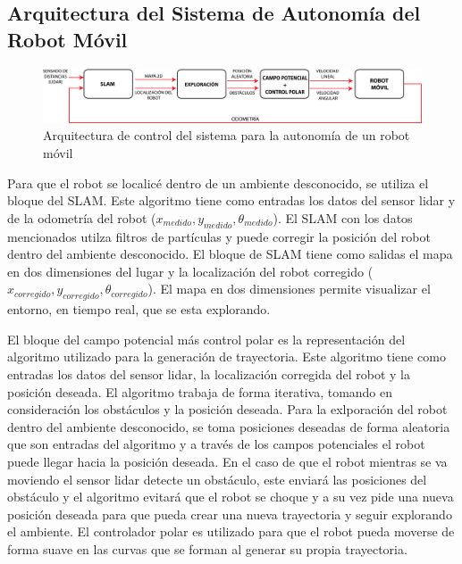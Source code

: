 
\subsection{Arquitectura del Sistema de Autonomía del Robot Móvil}

\begin{figure}%
	\centering \footnotesize
	\includegraphics[width=1.07\textwidth]{images/estructura_autonomia.jpg}
	\captionsetup{font=footnotesize}
	\caption{Arquitectura de control del sistema para la autonomía de un robot móvil}
	\label{fig:ArqSist}
\end{figure}
 
Para que el robot se localicé dentro de un ambiente desconocido, se utiliza el bloque del SLAM. 
Este algoritmo tiene como entradas los datos del sensor lidar y de la odometría del robot 
($x_{medido},y_{medido},\theta_{medido}$). El SLAM con los datos mencionados utilza filtros de 
partículas y puede corregir la posición del robot dentro del ambiente desconocido. El 
bloque de SLAM tiene como salidas el mapa en dos dimensiones del lugar y la localización del robot 
corregido ($x_{corregido},y_{corregido},\theta_{corregido}$). El mapa en dos dimensiones permite
visualizar el entorno, en tiempo real, que se esta explorando.

El bloque del campo potencial más control polar es la representación del algoritmo utilizado
para la generación de trayectoria. Este algoritmo tiene como entradas los datos del sensor 
lidar, la localización corregida del robot y la posición deseada. El algoritmo trabaja de forma 
iterativa, tomando en consideración los obstáculos y la posición deseada. Para la exlporación del 
robot dentro del ambiente desconocido, se toma posiciones deseadas de forma aleatoria que son
entradas del algoritmo y a través de los campos potenciales el robot puede llegar hacia la posición 
deseada. En el caso de que el robot mientras se va moviendo el sensor lidar detecte un obstáculo, 
este enviará las posiciones del obstáculo y el algoritmo evitará que el robot se choque y a su vez
pide una nueva posición deseada para que pueda crear una nueva trayectoria y seguir explorando el 
ambiente. El controlador polar es utilizado para que el robot pueda moverse de forma suave en las 
curvas que se forman al generar su propia trayectoria.

